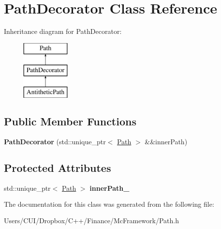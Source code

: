 \hypertarget{class_path_decorator}{}\section{Path\+Decorator Class Reference}
\label{class_path_decorator}
Inheritance diagram for Path\+Decorator\+:\begin{figure}[H]
\begin{center}
\leavevmode
\includegraphics[height=3.000000cm]{class_path_decorator}
\end{center}
\end{figure}
\subsection*{Public Member Functions}
\begin{DoxyCompactItemize}
\item 
\hypertarget{class_path_decorator_a26a8109e1d038f59140a243f1ceb6084}{}\label{class_path_decorator_a26a8109e1d038f59140a243f1ceb6084} 
{\bfseries Path\+Decorator} (std\+::unique\+\_\+ptr$<$ \hyperlink{class_path}{Path} $>$ \&\&inner\+Path)
\end{DoxyCompactItemize}
\subsection*{Protected Attributes}
\begin{DoxyCompactItemize}
\item 
\hypertarget{class_path_decorator_a91f1257f216052a32b4ea78feb9d0755}{}\label{class_path_decorator_a91f1257f216052a32b4ea78feb9d0755} 
std\+::unique\+\_\+ptr$<$ \hyperlink{class_path}{Path} $>$ {\bfseries inner\+Path\+\_\+}
\end{DoxyCompactItemize}


The documentation for this class was generated from the following file\+:\begin{DoxyCompactItemize}
\item 
Users/\+C\+U\+I/\+Dropbox/\+C++/\+Finance/\+Mc\+Framework/Path.\+h\end{DoxyCompactItemize}
